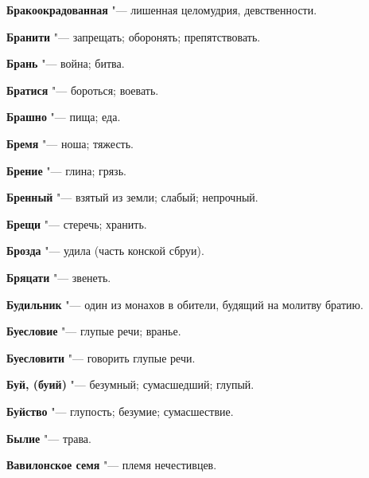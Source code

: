 \begin{mymulticols}{2}
\noindent\textbf{Бракоокрадованная} "--- лишенная целомудрия, девственности. 




\noindent\textbf{Бранити} "--- запрещать; оборонять; препятствовать. 




\noindent\textbf{Брань} "--- война; битва. 




\noindent\textbf{Братися} "--- бороться; воевать. 




\noindent\textbf{Брашно} "--- пища; еда. 




\noindent\textbf{Бремя} "--- ноша; тяжесть. 




\noindent\textbf{Брение} "--- глина; грязь. 




\noindent\textbf{Бренный} "--- взятый из земли; слабый; непрочный. 




\noindent\textbf{Брещи} "--- стеречь; хранить. 




\noindent\textbf{Брозда} "--- удила (часть конской сбруи). 




\noindent\textbf{Бряцати} "--- звенеть. 




\noindent\textbf{Будильник} "--- один из монахов в обители, будящий на молитву братию. 




\noindent\textbf{Буесловие} "--- глупые речи; вранье. 




\noindent\textbf{Буесловити} "--- говорить глупые речи. 




\noindent\textbf{Буй, (буий)} "--- безумный; сумасшедший; глупый. 




\noindent\textbf{Буйство} "--- глупость; безумие; сумасшествие. 




\noindent\textbf{Былие} "--- трава. 




\bukvaending






\noindent\textbf{Вавилонское семя} "--- племя нечестивцев. 





\end{mymulticols}
